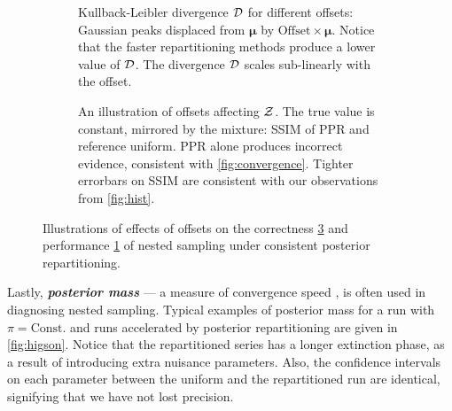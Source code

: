 \documentclass[usenatbib]{mnras}
\begin{document}
\begin{figure} \centering
  \begin{subfigure}{0.86\columnwidth}
    \centering

    
    \caption{Kullback-Leibler divergence \({\cal D}\) for different
      offsets: Gaussian peaks displaced from \(\bm{\mu}\) by
      \(\text{Offset}\times \bm{\mu}\). Notice that the faster
      repartitioning methods produce a lower value of \({\cal
        D}\). The divergence \({\cal D}\) scales sub-linearly with the
      offset.\label{fig:kl-d}}
\end{subfigure}

\begin{subfigure}{0.86\columnwidth}
  \centering

  
  
  \caption{An illustration of offsets affecting ${\cal Z}$. The true
    value is constant, mirrored by the mixture: SSIM of PPR and
    reference uniform. PPR alone produces incorrect evidence,
    consistent with \cref{fig:convergence}. Tighter errorbars on SSIM
    are consistent with our observations from
    \cref{fig:hist}.\label{fig:drift}}
\end{subfigure}
\caption{Illustrations of effects of offsets on the correctness
  \ref{fig:drift} and performance \ref{fig:kl-d} of nested sampling
  under consistent posterior repartitioning.}
\end{figure}



Lastly, \textbf{\emph{posterior mass}} --- a measure of convergence
speed \citep{higson2018nestcheck}, is often used in diagnosing nested
sampling. Typical examples of posterior mass for a run with
$\pi=\text{Const.}$ and runs accelerated by posterior repartitioning
are given in \cref{fig:higson}. Notice that the repartitioned series
has a longer extinction phase, as a result of introducing extra
nuisance parameters. Also, the confidence intervals on each parameter
between the uniform and the repartitioned run are identical,
signifying that we have not lost precision.
\end{document}
